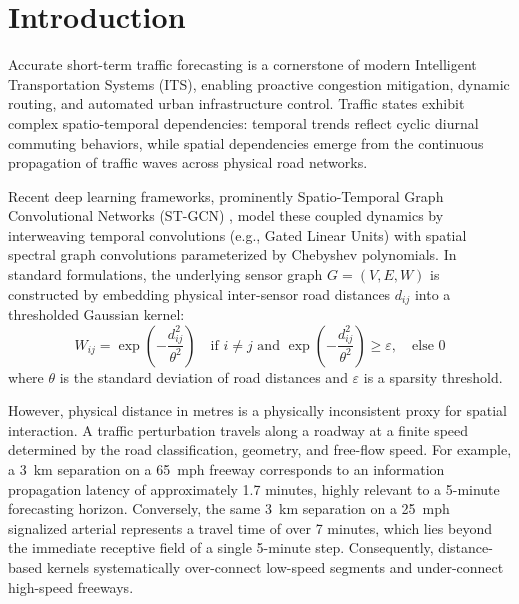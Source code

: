 \documentclass[pdflatex,sn-mathphys-num]{sn-jnl}
\theoremstyle{thmstyleone}
\theoremstyle{thmstyletwo}
\theoremstyle{thmstylethree}
\begin{document}

\maketitle

\section{Introduction}\label{sec:intro}

Accurate short-term traffic forecasting is a cornerstone of modern Intelligent Transportation Systems (ITS), enabling proactive congestion mitigation, dynamic routing, and automated urban infrastructure control. Traffic states exhibit complex spatio-temporal dependencies: temporal trends reflect cyclic diurnal commuting behaviors, while spatial dependencies emerge from the continuous propagation of traffic waves across physical road networks.

Recent deep learning frameworks, prominently Spatio-Temporal Graph Convolutional Networks (ST-GCN) \cite{yu2018spatio}, model these coupled dynamics by interweaving temporal convolutions (e.g., Gated Linear Units) with spatial spectral graph convolutions parameterized by Chebyshev polynomials. In standard formulations, the underlying sensor graph $G = (V, E, W)$ is constructed by embedding physical inter-sensor road distances $d_{ij}$ into a thresholded Gaussian kernel:
\begin{equation}
W_{ij} = \exp\left(-\frac{d_{ij}^2}{\theta^2}\right) \quad \text{if } i \neq j \text{ and } \exp\left(-\frac{d_{ij}^2}{\theta^2}\right) \ge \varepsilon, \quad \text{else } 0
\label{eq:vanilla_adj}
\end{equation}
where $\theta$ is the standard deviation of road distances and $\varepsilon$ is a sparsity threshold.

However, physical distance in metres is a physically inconsistent proxy for spatial interaction. A traffic perturbation travels along a roadway at a finite speed determined by the road classification, geometry, and free-flow speed. For example, a 3~km separation on a 65~mph freeway corresponds to an information propagation latency of approximately 1.7 minutes, highly relevant to a 5-minute forecasting horizon. Conversely, the same 3~km separation on a 25~mph signalized arterial represents a travel time of over 7 minutes, which lies beyond the immediate receptive field of a single 5-minute step. Consequently, distance-based kernels systematically over-connect low-speed segments and under-connect high-speed freeways.
\end{document}
